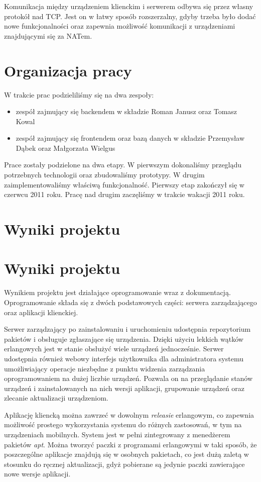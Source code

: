 \documentclass[polish,12pt]{aghthesis}
\begin{document}
Komunikacja między urządzeniem klienckim i serwerem odbywa się przez własny protokół nad TCP. Jest on w łatwy sposób rozszerzalny, gdyby trzeba było dodać nowe funkcjonalności oraz zapewnia możliwość komunikacji z urządzeniami znajdującymi się za NATem.

\section{Organizacja pracy}

W trakcie prac podzieliliśmy się na dwa zespoły:
\begin{itemize}
\item zespół zajmujący się backendem w składzie Roman Janusz oraz Tomasz Kowal
\item zespół zajmujący się frontendem oraz bazą danych w składzie Przemysław Dąbek oraz Małgorzata Wielgus
\end{itemize}

Prace zostały podzielone na dwa etapy. W pierwszym dokonaliśmy przeglądu potrzebnych technologii oraz zbudowaliśmy prototypy. W drugim zaimplementowaliśmy właściwą funkcjonalność.
Pierwszy etap zakończył się w czerwcu 2011 roku. Pracę nad drugim zaczęliśmy w trakcie wakacji 2011 roku.

\section{Wyniki projektu}

\section{Wyniki projektu}

Wynikiem projektu jest działające oprogramowanie wraz z dokumentacją. Oprogramowanie składa się z dwóch podstawowych części: serwera zarządzającego oraz aplikacji klienckiej.

Serwer zarządzający po zainstalowaniu i uruchomieniu udostępnia repozytorium pakietów i obsługuje zgłaszające się urządzenia. Dzięki użyciu lekkich wątków erlangowych jest w stanie obsłużyć wiele urządzeń jednocześnie. Serwer udostępnia również webowy interfejs użytkownika dla administratora systemu umożliwiający operacje niezbędne z punktu widzenia zarządzania oprogramowaniem na dużej liczbie urządzeń. Pozwala on na przeglądanie stanów urządzeń i zainstalowanych na nich wersji aplikacji, grupowanie urządzeń oraz zlecanie aktualizacji urządzeniom.

Aplikację kliencką można zawrzeć w dowolnym \emph{releasie} erlangowym, co zapewnia możliwość prostego wykorzystania systemu do różnych zastosowań, w tym na urządzeniach mobilnych. System jest w pełni zintegrowany z menedżerem pakietów \emph{apt}. Można tworzyć paczki z programami erlangowymi w taki sposób, że poszczególne aplikacje znajdują się w osobnych pakietach, co jest dużą zaletą w stosunku do ręcznej aktualizacji, gdyż pobierane są jedynie paczki zawierające nowe wersje aplikacji.
\end{document}
